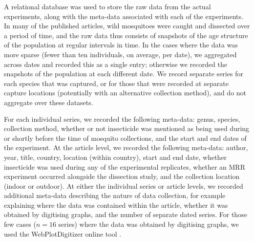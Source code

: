 \documentclass[12pt]{article}
\begin{document}
{A relational database was used to store the raw data from the actual experiments, along with the meta-data associated with each of the experiments. In many of the published articles, wild mosquitoes were caught and dissected over a period of time, and the raw data thus consists of snapshots of the age structure of the population at regular intervals in time. In the cases where the data was more sparse (fewer than ten individuals, on average, per date), we aggregated across dates and recorded this as a single entry; otherwise we recorded the snapshots of the population at each different date. We record separate series for each species that was captured, or for those that were recorded at separate capture locations (potentially with an alternative collection method), and do not aggregate over these datasets.

For each individual series, we recorded the following meta-data: genus, species, collection method, whether or not insecticide was mentioned as being used during or shortly before the time of mosquito collections, and the start and end dates of the experiment. At the article level, we recorded the following meta-data: author, year, title, country, location (within country), start and end date, whether insecticide was used during any of the experimental replicates, whether an MRR experiment occurred alongside the dissection study, and the collection location (indoor or outdoor). At either the individual series or article levels, we recorded additional meta-data describing the nature of data collection, for example explaining where the data was contained within the article, whether it was obtained by digitising graphs, and the number of separate dated series. For those few cases ($n=16$ series) where the data was obtained by digitising graphs, we used the WebPlotDigitizer online tool \citep{digitise}.

}
\end{document}
